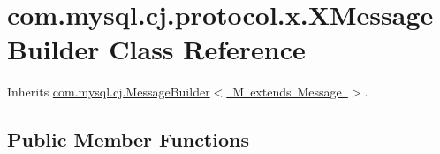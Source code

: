 \hypertarget{classcom_1_1mysql_1_1cj_1_1protocol_1_1x_1_1_x_message_builder}{}\section{com.\+mysql.\+cj.\+protocol.\+x.\+X\+Message\+Builder Class Reference}
\label{classcom_1_1mysql_1_1cj_1_1protocol_1_1x_1_1_x_message_builder}


Inherits \mbox{\hyperlink{interfacecom_1_1mysql_1_1cj_1_1_message_builder}{com.\+mysql.\+cj.\+Message\+Builder$<$ M extends Message $>$}}.

\subsection*{Public Member Functions}
